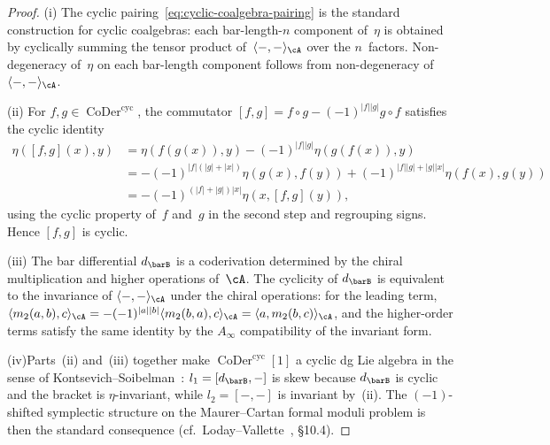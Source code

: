 \begin{proof}
(i)\enspace
The cyclic pairing~\eqref{eq:cyclic-coalgebra-pairing} is the
standard construction for cyclic coalgebras:
each bar-length-$n$ component of~$\eta$ is obtained by cyclically
summing the tensor product of~$\langle{-},{-}\rangle_{\cA}$ over
the $n$~factors. Non-degeneracy of~$\eta$ on each bar-length
component follows from non-degeneracy
of~$\langle{-},{-}\rangle_{\cA}$.

(ii)\enspace
For $f,g\in\operatorname{CoDer}^{\mathrm{cyc}}$, the
commutator $[f,g] = f\circ g - (-1)^{|f||g|}g\circ f$ satisfies
the cyclic identity
\begin{align*}
\eta([f,g](x),y) &= \eta(f(g(x)),y) -
(-1)^{|f||g|}\eta(g(f(x)),y)\\
&= -(-1)^{|f|(|g|+|x|)}\eta(g(x),f(y))
 + (-1)^{|f||g|+|g||x|}\eta(f(x),g(y))\\
&= -(-1)^{(|f|+|g|)|x|}\eta(x,[f,g](y)),
\end{align*}
using the cyclic property of~$f$ and~$g$ in the second step and
regrouping signs. Hence $[f,g]$ is cyclic.

(iii)\enspace
The bar differential $d_{\barB}$ is a coderivation determined by
the chiral multiplication and higher operations of~$\cA$.
The cyclicity of $d_{\barB}$ is equivalent to the invariance of
$\langle{-},{-}\rangle_{\cA}$ under the chiral operations:
for the leading term,
$\langle m_2(a,b),c\rangle_{\cA}
= -(-1)^{|a||b|}\langle m_2(b,a),c\rangle_{\cA}
= \langle a, m_2(b,c)\rangle_{\cA}$,
and the higher-order terms satisfy the same identity by the
$A_\infty$ compatibility of the invariant form.

(iv)\enspace Parts~(ii) and~(iii) together make
$\operatorname{CoDer}^{\mathrm{cyc}}[1]$ a cyclic dg Lie algebra
in the sense of Kontsevich--Soibelman~\cite{KontsevichSoibelman}:
$l_1 = [d_{\barB},-]$ is skew because $d_{\barB}$ is cyclic and
the bracket is $\eta$-invariant, while $l_2 = [-,-]$ is invariant
by~(ii). The $(-1)$-shifted symplectic structure on the
Maurer--Cartan formal moduli problem is then the standard
consequence (cf.\ Loday--Vallette~\cite{LV12}, \S10.4).
\end{proof}

